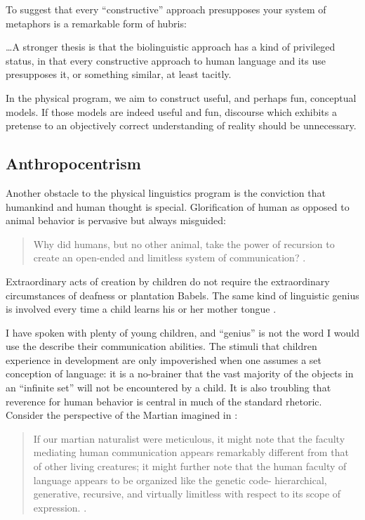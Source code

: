 To suggest that every “constructive” approach presupposes your system of metaphors is a remarkable form of hubris:

…A stronger thesis is that the biolinguistic approach has a kind of privileged status, in that every constructive approach to human language and its use presupposes it, or something similar, at least tacitly. \citep{Chomsky2001a}

  In the physical program, we aim to construct useful, and perhaps fun, conceptual models. If those models are indeed useful and fun, discourse which exhibits a pretense to an objectively correct understanding of reality should be unnecessary.

\subsection{Anthropocentrism}

Another obstacle to the physical linguistics program is the conviction that humankind and human thought is special. Glorification of human as opposed to animal behavior is pervasive but always misguided:

\begin{quote}
Why did humans, but no other animal, take the power of recursion to create an open-ended and limitless system of communication? \citep{HauserEtAl2002}.
\end{quote}


Extraordinary acts of creation by children do not require the extraordinary circumstances of deafness or plantation Babels. The same kind of linguistic genius is involved every time a child learns his or her mother tongue \citep{Pinker2003}.

  I have spoken with plenty of young children, and “genius” is not the word I would use the describe their communication abilities. The stimuli that children experience in development are only impoverished when one assumes a set conception of language: it is a no-brainer that the vast majority of the objects in an “infinite set” will not be encountered by a child. It is also troubling that reverence for human behavior is central in much of the standard rhetoric. Consider the perspective of the Martian imagined in \citet{HauserEtAl2002}:


\begin{quote}
If our martian naturalist were meticulous, it might note that the faculty mediating human communication appears remarkably different from that of other living creatures; it might further note that the human faculty of language appears to be organized like the genetic code- hierarchical, generative, recursive, and virtually limitless with respect to its scope of expression. \citep{HauserEtAl2002}.
\end{quote}


